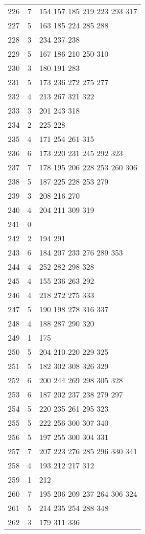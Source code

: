 \documentclass{standalone}
\begin{document}
\begin{tabular}{c c l}
226 & 7 & 154 157 185 219 223 293 317 \\
227 & 5 & 163 185 224 285 288 \\
228 & 3 & 234 237 238 \\
229 & 5 & 167 186 210 250 310 \\
230 & 3 & 180 191 283 \\
231 & 5 & 173 236 272 275 277 \\
232 & 4 & 213 267 321 322 \\
233 & 3 & 201 243 318 \\
234 & 2 & 225 228 \\
235 & 4 & 171 254 261 315 \\
236 & 6 & 173 220 231 245 292 323 \\
237 & 7 & 178 195 206 228 253 260 306 \\
238 & 5 & 187 225 228 253 279 \\
239 & 3 & 208 216 270 \\
240 & 4 & 204 211 309 319 \\
241 & 0 &  \\
242 & 2 & 194 291 \\
243 & 6 & 184 207 233 276 289 353 \\
244 & 4 & 252 282 298 328 \\
245 & 4 & 155 236 263 292 \\
246 & 4 & 218 272 275 333 \\
247 & 5 & 190 198 278 316 337 \\
248 & 4 & 188 287 290 320 \\
249 & 1 & 175 \\
250 & 5 & 204 210 220 229 325 \\
251 & 5 & 182 302 308 326 329 \\
252 & 6 & 200 244 269 298 305 328 \\
253 & 6 & 187 202 237 238 279 297 \\
254 & 5 & 220 235 261 295 323 \\
255 & 5 & 222 256 300 307 340 \\
256 & 5 & 197 255 300 304 331 \\
257 & 7 & 207 223 276 285 296 330 341 \\
258 & 4 & 193 212 217 312 \\
259 & 1 & 212 \\
260 & 7 & 195 206 209 237 264 306 324 \\
261 & 5 & 214 235 254 288 348 \\
262 & 3 & 179 311 336 \\

\end{tabular}
\end{document}
